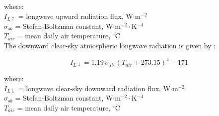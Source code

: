 \noindent where: \\
\indent $I_{L\uparrow}$ = longwave upward radiation flux, W$\cdot$m$^{-2}$\\
\indent $\sigma_{sb}$ = Stefan-Boltzman constant, W$\cdot$m$^{-2}\cdot$K$^{-4}$\\
\indent $T_{air}$ = mean daily air temperature, $^{\circ}$C \\

\noindent The downward clear-sky atmospheric longwave radiation is given by \parencite[Eq. 20]{linacre68}:

\begin{equation}
\label{eq:rld}
	I_{L\downarrow} = 1.19\:\sigma_{sb}\: \left(T_{air} + 273.15 \right)^4 - 171
\end{equation}

\noindent where: \\
\indent $I_{L\downarrow}$ = longwave clear-sky downward radiation flux, W$\cdot$m$^{-2}$\\
\indent $\sigma_{sb}$ = Stefan-Boltzman constant, W$\cdot$m$^{-2}\cdot$K$^{-4}$\\
\indent $T_{air}$ = mean daily air temperature, $^{\circ}$C \\


